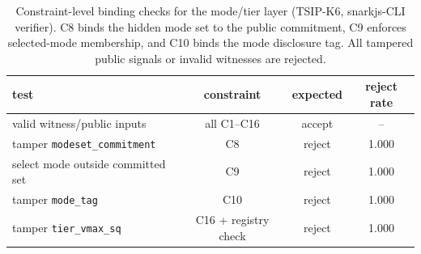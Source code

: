 \begin{table}[t]
\centering
\caption{Constraint-level binding checks for the mode/tier layer
(\textsc{TSIP-K6}, snarkjs-CLI verifier). C8 binds the hidden mode set to the
public commitment, C9 enforces selected-mode membership, and C10 binds the
mode disclosure tag. All tampered public signals or invalid witnesses are
rejected.}
\label{tab:mode-ablation}
\scriptsize
\setlength{\tabcolsep}{3pt}
\begin{tabularx}{\columnwidth}{@{}Y c c c@{}}
\toprule
test & constraint & expected & reject rate \\
\midrule
valid witness/public inputs & all C1--C16 & accept & -- \\
tamper \texttt{modeset\_commitment} & C8 & reject & 1.000 \\
select mode outside committed set & C9 & reject & 1.000 \\
tamper \texttt{mode\_tag} & C10 & reject & 1.000 \\
tamper \texttt{tier\_vmax\_sq} & C16 + registry check & reject & 1.000 \\
\bottomrule
\end{tabularx}
\end{table}
